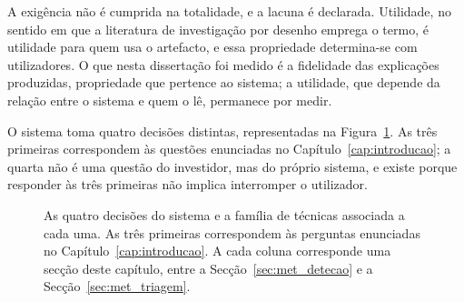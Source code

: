 A exigência não é cumprida na totalidade, e a lacuna é declarada. Utilidade, no sentido em que a
literatura de investigação por desenho emprega o termo, é utilidade para quem usa o artefacto, e
essa propriedade determina-se com utilizadores. O que nesta dissertação foi medido é a fidelidade
das explicações produzidas, propriedade que pertence ao sistema; a utilidade, que depende da
relação entre o sistema e quem o lê, permanece por medir.

O sistema toma quatro decisões distintas, representadas na Figura~\ref{fig:met_decisoes}. As três
primeiras correspondem às questões enunciadas no Capítulo~\ref{cap:introducao}; a quarta não é uma
questão do investidor, mas do próprio sistema, e existe porque responder às três primeiras não
implica interromper o utilizador.

\begin{figure}[ht]
\centering
{}
\caption[As quatro decisões do sistema]{As quatro decisões do sistema e a família de técnicas
associada a cada uma. As três primeiras correspondem às perguntas enunciadas no
Capítulo~\ref{cap:introducao}. A cada coluna corresponde uma secção deste capítulo, entre a
Secção~\ref{sec:met_detecao} e a Secção~\ref{sec:met_triagem}.}
\label{fig:met_decisoes}
\end{figure}


